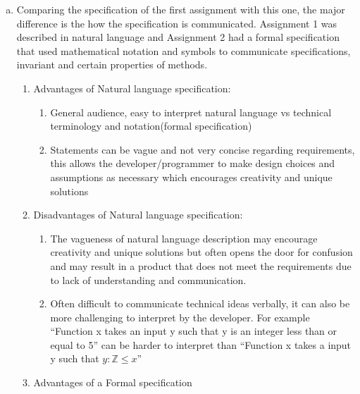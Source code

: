 \documentclass[12pt]{article}
\begin{document}
\begin{enumerate}[a)]

\item Comparing the specification of the first assignment with this one, the major difference is the how the specification is communicated. Assignment 1 was described in natural language and Assignment 2 had a formal specification that used mathematical notation and symbols to communicate specifications, invariant and certain properties of methods. 

\begin{enumerate}
\item Advantages of Natural language specification:
	\begin{enumerate}
	
	\item General audience, easy to interpret natural language vs technical terminology and notation(formal specification)
	\item Statements can be vague and not very concise regarding requirements, this allows the developer/programmer to make design choices and assumptions as necessary which encourages creativity and unique solutions
	
	\end{enumerate}
\item Disadvantages of Natural language specification:

	\begin{enumerate}
	
	\item The vagueness of natural language description may encourage creativity and unique solutions but often opens the door for confusion and may result in a product that does not meet the requirements due to lack of understanding and communication.
	\item Often difficult to communicate technical ideas verbally, it can also be more challenging to interpret by the developer. For example ``Function x takes an input y such that y is an integer less than or equal to 5'' can be harder to interpret than ``Function x takes a input y such that $y : \mathbb{Z} \leq x$''
	
	\end{enumerate}
	
	\item Advantages of a Formal specification
	

\end{enumerate}
\end{enumerate}
\end{document}
